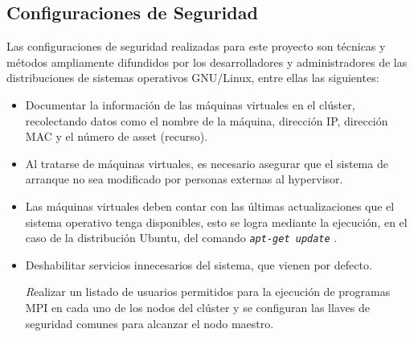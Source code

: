 \documentclass[letterpaper, 12pt, oneside]{article}
\begin{document}
    \subsection{Configuraciones de Seguridad}
    Las configuraciones de seguridad realizadas para este proyecto son técnicas y métodos ampliamente difundidos por los desarrolladores y administradores de las distribuciones de sistemas operativos GNU/Linux\cite{LINUXHARDENING}\cite{LINUXHARDENING2}\cite{LINUXHARDENING3}, entre ellas las siguientes:
    \begin{itemize}
        \item Documentar la información de las máquinas virtuales en el clúster, recolectando datos como el nombre de la máquina, dirección IP, dirección MAC y el número de asset (recurso).
        
        \item Al tratarse de máquinas virtuales, es necesario asegurar que el sistema de arranque no sea modificado por personas externas al hypervisor.
        
        \item Las máquinas virtuales deben contar con las últimas actualizaciones que el sistema operativo tenga disponibles, esto se logra mediante la ejecución, en el caso de la distribución Ubuntu, del comando \textit{ \texttt{apt-get update} }.
        
        \item Deshabilitar servicios innecesarios del sistema, que vienen por defecto.
        
        \textit Realizar un listado de usuarios permitidos para la ejecución de programas MPI en cada uno de los nodos del clúster y se configuran las llaves de seguridad comunes para alcanzar el nodo maestro.
        
    \end{itemize}
    
\end{document}
